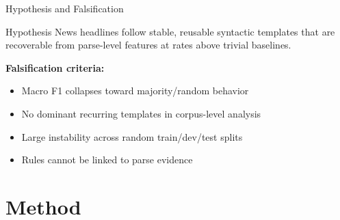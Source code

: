 \documentclass[aspectratio=169, 11pt]{beamer}
\begin{document}
\begin{frame}{Hypothesis and Falsification}
  \begin{block}{Hypothesis}
    News headlines follow stable, reusable syntactic templates that are recoverable from parse-level features at rates above trivial baselines.
  \end{block}

  \vspace{0.8em}

  \textbf{Falsification criteria:}
  \begin{itemize}
    \item Macro F1 collapses toward majority/random behavior
    \item No dominant recurring templates in corpus-level analysis
    \item Large instability across random train/dev/test splits
    \item Rules cannot be linked to parse evidence
  \end{itemize}
\end{frame}

\section{Method}
\end{document}
